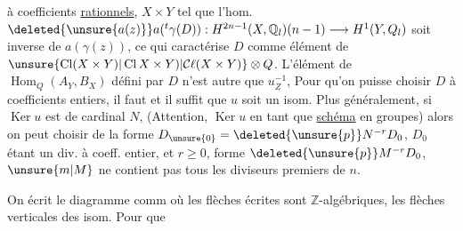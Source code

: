  à coefficients \uline{rationnels},  $X\times Y$ tel que l'hom. $\deleted{\unsure{a(z)}}a({}^t\gamma(D)):H^{2n-1}(X,\mathbb Q_l)(n-1)\longrightarrow H^1(Y,Q_l)$ soit inverse de $a(\gamma(z))$, ce qui caractérise $D$ comme élément de $\unsure{\operatorname{Cl}(X\times Y)|\operatorname{Cl}X\times Y)|\mathcal C\ell(X\times Y)}\otimes Q$. L'élément de $\operatorname{Hom}_{Q}(A_Y,B_X)$ défini par $D$ n'est autre que $u_Z^{-1}$,  Pour qu'on puisse choisir $D$ à coefficients entiers, il faut et il suffit que $u$ soit un isom.  Plus généralement, si $\operatorname{Ker}u$ est de cardinal $N$,  (Attention, $\operatorname{Ker}u$ en tant que \uline{schéma} en groupes) alors on peut choisir  de la forme $D_{\unsure{0}}=\deleted{\unsure{p}}N^{-r}D_0$, $D_0$ étant un div. à coeff. entier, et $r\geq0$,  forme $\deleted{\unsure{p}}M^{-r}D_0$,  $\unsure{m|M}$ ne contient pas tous les diviseurs premiers de $n$.

On écrit le diagramme comm
où  les flèches écrites sont $\mathbb Z$-algébriques, les flèches verticales des isom.  Pour que

